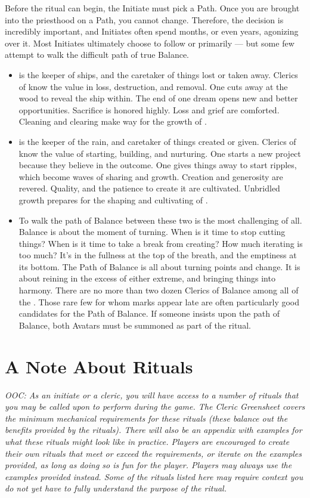 \documentclass[blue]{GL2020}
\begin{document}
Before the ritual can begin, the Initiate must pick a Path. Once you are brought into the priesthood on a Path, you cannot change. Therefore, the decision is incredibly important, and Initiates often spend months, or even years, agonizing over it. Most Initiates ultimately choose to follow \cEbb{} or \cFlow{} primarily — but some few attempt to walk the difficult path of true Balance.
\begin{itemize}
  \item \cEbbFull{\full} is the keeper of ships, and the caretaker of things lost or taken away. Clerics of \cEbb{} know the value in loss, destruction, and removal. One cuts away at the wood to reveal the ship within. The end of one dream opens new and better opportunities. Sacrifice is honored highly. Loss and grief are comforted. Cleaning and clearing make way for the growth of \cFlow{}.
  \item \cFlowFull{\full} is the keeper of the rain, and caretaker of things created or given. Clerics of \cFlow{} know the value of starting, building, and nurturing. One starts a new project because they believe in the outcome. One gives things away to start ripples, which become waves of sharing and growth. Creation and generosity are revered. Quality, and the patience to create it are cultivated. Unbridled growth prepares for the shaping and cultivating of \cEbb{}.
  \item To walk the path of Balance between these two is the most challenging of all. Balance is about the moment of turning. When is it time to stop cutting things? When is it time to take a break from creating? How much iterating is too much? It's in the fullness at the top of the breath, and the emptiness at its bottom. The Path of Balance is all about turning points and change. It is about reining in the excess of either extreme, and bringing things into harmony. There are no more than two dozen Clerics of Balance among all of the \pShippies{}. Those rare few for whom marks appear late are often particularly good candidates for the Path of Balance. If someone insists upon the path of Balance, both Avatars must be summoned as part of the ritual.
\end{itemize}

\section*{A Note About Rituals}
\emph{OOC: As an initiate or a cleric, you will have access to a number of rituals that you may be called upon to perform during the game. The Cleric Greensheet covers the minimum mechanical requirements for these rituals (these balance out the benefits provided by the rituals). There will also be an appendix with examples for what these rituals might look like in practice. Players are encouraged to create their own rituals that meet or exceed the requirements, or iterate on the examples provided, as long as doing so is fun for the player. Players may always use the examples provided instead. Some of the rituals listed here may require context you do not yet have to fully understand the purpose of the ritual.}
\end{document}
